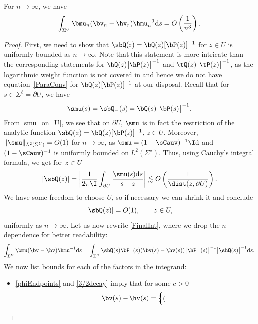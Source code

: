 \begin{Lemma}\label{FinalLemma}
For $n \to \infty$, we have
\begin{align}\label{FinalInt}
 \int_{ \Sigma^U} \bmu_n(\bv_n-\hv_n)\hmu_n^{-1} {\rm d}s = O\left(\frac{1}{n^3}\right).
\end{align}
\end{Lemma}
\begin{proof}
First, we need to show that $\sbQ(z) = \bQ(z)[\bP(z)]^{-1}$ for $z \in U$ is uniformly bounded as $n \to \infty$. Note that this statement is more intricate than the corresponding statements for $\hQ(z)\big[\hP(z)\big]^{-1}$ and $\tQ(z)\big[\tP(z)\big]^{-1}$, as the logarithmic weight function is not covered in \cite{KMVV} and hence we do not have equation~\eqref{ParaConv} for $\bQ(z)[\bP(z)]^{-1}$ at our disposal. Recall that for~${s\!\in\! \Sigma^\ell = \partial U}$, we have
\begin{align}\label{smu_on_U}
 \smu(s) = \sbQ_-(s) = \bQ(s)\big[\bP(s)\big]^{-1}.
\end{align}
From \eqref{smu_on_U}, we see that on $\partial U$, $\smu$ is in fact the restriction of the analytic function $\sbQ(z) = \bQ(z)[\bP(z)]^{-1}$, $z\in U$. Moreover, $\Vert \smu \Vert_{L^2( \Sigma^U)} = O(1)$ for $n \to \infty$, as $\smu = (1-\sCauv)^{-1}\Id$ and~${(1-\sCauv)^{-1}}$ is uniformly bounded on $L^2(\Sigma^\star)$. Thus, using Cauchy's integral formula, we get for~$z \in U$
\begin{align*}
 |\sbQ(z)| = \bigg|\frac{1}{2\pi\I} \int_{\partial U} \frac{\smu(s){\rm d}s}{s-z}\bigg| \lesssim O\left(\frac{1}{\dist(z,\partial U)}\right).
\end{align*}
We have some freedom to choose $U$, so if necessary we can shrink it and conclude
\begin{align}\label{Qstar}
 |\sbQ(z)| = O(1), \qquad z\in U,
\end{align}
uniformly as $n \to \infty$. Let us now rewrite \eqref{FinalInt}, where we drop the $n$-dependence for better readability:
\begin{align}\label{FinalInt2}
 \int_{ \Sigma^U} \bmu(\bv-\hv)\hmu^{-1} {\rm d}s = \int_{ \Sigma^U} \sbQ(s)\bP_-(s)(\bv(s)-\hv(s))\big[\hP_-(s)\big]^{-1}\big[\shQ(s)\big]^{-1} {\rm d}s.
\end{align}
We now list bounds for each of the factors in the integrand:
\begin{itemize}\itemsep=0pt
 \item \eqref{phiEndpoints} and \eqref{3/2decay} imply that for some $c > 0$
 \begin{align*}\bv(s)-\hv(s) =\begin{cases} \begin{pmatrix}

\end{pmatrix}
\end{cases}
\end{align*}
\end{itemize}
\end{proof}
